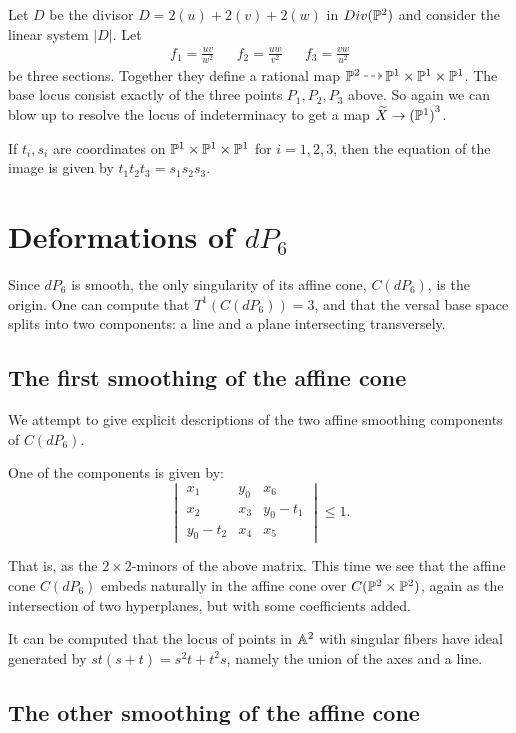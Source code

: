 \documentclass[11pt, english]{article}
\begin{document}
Let $D$ be the divisor $D=2(u)+2(v)+2(w)$ in $Div(\mathbb{P}^2)$ and consider the linear system $\lvert D \rvert$. Let 
\begin{align*}
 f_1 = \frac{uv}{w^2} && f_2 = \frac{uw}{v^2} && f_3 = \frac{vw}{u^2}
\end{align*}
be three sections. Together they define a rational map $\PP^2 \rmap \PP^1 \times \PP^1 \times \PP^1$. The base locus consist exactly of the three points $P_1,P_2,P_3$ above. So again we can blow up to resolve the locus of indeterminacy to get a map $\widetilde X \to {(\mathbb{P}^1)}^3$.

If $t_i,s_i$ are coordinates on $\mathbb{P}^1 \times \mathbb{P}^1 \times \mathbb{P}^1$ for $i=1,2,3$, then the equation of the image is given by $t_1t_2t_3=s_1s_2s_3$. 

\section{Deformations of $dP_6$}

Since $dP_6$ is smooth, the only singularity of its affine cone, $C(dP_6)$, is the origin. One can compute that $T^1(C(dP_6))=3$, and that the versal base space splits into two components: a line and a plane intersecting transversely.

\subsection{The first smoothing of the affine cone}

We attempt to give explicit descriptions of the two affine smoothing components of $C(dP_6)$. 

One of the components is given by:
\[
\begin{vmatrix}
x_1 & y_0 & x_6 \\
x_2 & x_3 & y_0-t_1 \\
y_0-t_2 & x_4 & x_5
\end{vmatrix} \leq 1.
\]

That is, as the $2 \times 2$-minors of the above matrix. This time we see that the affine cone $C(dP_6)$ embeds naturally in the affine cone over $C(\mathbb{P}^2 \times \mathbb{P}^2)$, again as the intersection of two hyperplanes, but with some coefficients added.

It can be computed that the locus of points in $\mathbb{A}^2$ with singular fibers have ideal generated by $st(s+t)=s^2t+t^2s$, namely the union of the axes and a line.

\subsection{The other smoothing of the affine cone}
\end{document}
